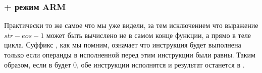 \subsubsection{\OptimizingKeil{} + режим ARM}



Практически то же самое что мы уже видели, за тем исключением что выражение $str - eos - 1$ может быть вычислено
не в самом конце функции, а прямо в теле цикла. Суффикс , как мы помним, означает что инструкция будет выполнена только
если операнды в исполненной перед этим инструкции \CMP были равны. 
Таким образом, если в  будет 0, обе инструкции  исполнятся и результат останется в .

